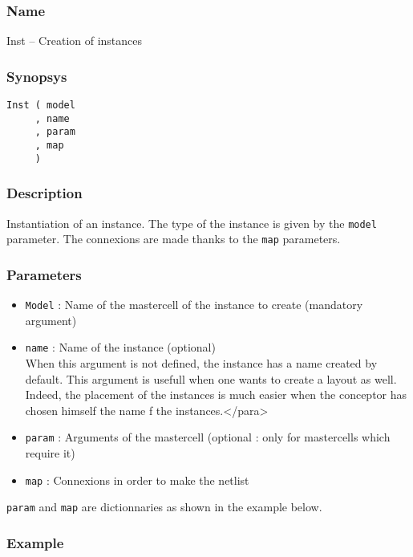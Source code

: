 \subsubsection{Name}

Inst -- Creation of instances

\subsubsection{Synopsys}

\begin{verbatim}
Inst ( model
     , name
     , param
     , map 
     )
\end{verbatim}

\subsubsection{Description}

Instantiation of an instance. The type of the instance is given by the \verb-model- parameter. The connexions are made thanks to the \verb-map- parameters.

\subsubsection{Parameters}

\begin{itemize}
    \item \verb-Model- : Name of the mastercell of the instance to create (mandatory argument)
    \item \verb-name- : Name of the instance (optional)\\
When this argument is not defined, the instance has a name created by default. This argument is usefull when one wants to create a layout as well. Indeed, the placement of the instances is much easier when the conceptor has chosen himself the name f the instances.</para>
    \item \verb-param- : Arguments of the mastercell (optional : only for mastercells which require it)
    \item \verb-map- : Connexions in order to make the netlist\\
\end{itemize}
\indent \verb-param- and \verb-map- are dictionnaries as shown in the example below.

\subsubsection{Example}

